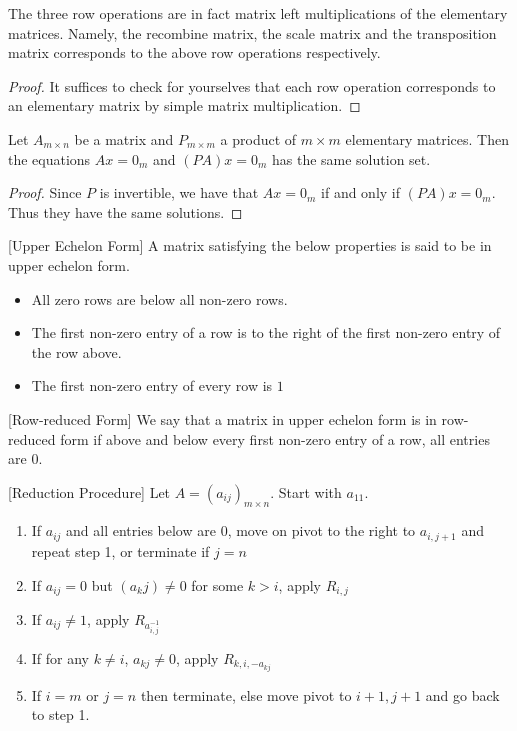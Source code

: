 \documentclass[a4paper]{article}
\begin{document}
\begin{thm}{}{} The three row operations are in fact matrix left multiplications of the elementary matrices. Namely, the recombine matrix, the scale matrix and the transposition matrix corresponds to the above row operations respectively. 
\end{thm}
\begin{proof} It suffices to check for yourselves that each row operation corresponds to an elementary matrix by simple matrix multiplication. 
\end{proof}

\begin{thm}{}{} Let $A_{m\times n}$ be a matrix and $P_{m\times m}$ a product of $m\times m$ elementary matrices. Then the equations $Ax=0_m$ and $(PA)x=0_m$ has the same solution set. 
\end{thm}
\begin{proof} Since $P$ is invertible, we have that $Ax=0_m$ if and only if $(PA)x=0_m$. Thus they have the same solutions. 
\end{proof}

\begin{defn}{}{}[Upper Echelon Form] A matrix satisfying the below properties is said to be in upper echelon form. 
\begin{itemize}
\item All zero rows are below all non-zero rows. 
\item The first non-zero entry of a row is to the right of the first non-zero entry of the row above. 
\item The first non-zero entry of every row is $1$
\end{itemize}
\end{defn}

\begin{defn}{}{}[Row-reduced Form] We say that a matrix in upper echelon form is in row-reduced form if above and below every first non-zero entry of a row, all entries are $0$. 
\end{defn}

\begin{defn}{}{}[Reduction Procedure] Let $A=(a_{ij})_{m\times n}$. Start with $a_{11}$. 
\begin{enumerate}
\item If $a_{ij}$ and all entries below are $0$, move on pivot to the right to $a_{i,j+1}$ and repeat step 1, or terminate if $j=n$
\item If $a_{ij}=0$ but $(a_kj)\neq 0$ for some $k>i$, apply $R_{i,j}$
\item If $a_{ij}\neq 1$, apply $R_{a_{i,j}^{-1}}$
\item If for any $k\neq i$, $a_{kj}\neq 0$, apply $R_{k,i,-a_{kj}}$
\item If $i=m$ or $j=n$ then terminate, else move pivot to $i+1,j+1$ and go back to step 1. 
\end{enumerate}
\end{defn}
\end{document}
